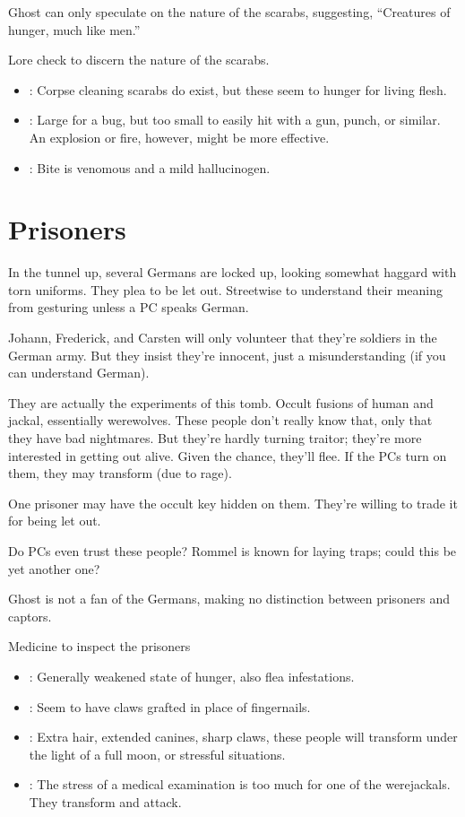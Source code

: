 \documentclass{book}
\newcommand{\df}{\DifficultyDie }
\newcommand{\stb}{\SetbackDie }
\begin{document}
\begin{multicols}{2}
Ghost can only speculate on the nature of the scarabs, suggesting, ``Creatures of hunger, much like men.''

\df\df Lore check to discern the nature of the scarabs.
    \begin{itemize}
        \item \Success: Corpse cleaning scarabs do exist, but these seem to hunger for living flesh.
        \item \Advantage: Large for a bug, but too small to easily hit with a gun, punch, or similar.  An explosion or fire, however, might be more effective.
        \item \Advantage: Bite is venomous and a mild hallucinogen.
    \end{itemize}

\section{Prisoners}

In the tunnel up, several Germans are locked up, looking somewhat haggard with torn uniforms.  They plea to be let out.  \df\df Streetwise to understand their meaning from gesturing unless a PC speaks German.

Johann, Frederick, and Carsten will only volunteer that they're soldiers in the German army.  But they insist they're innocent, just a misunderstanding (if you can understand German).

They are actually the experiments of this tomb.  Occult fusions of human and jackal, essentially werewolves.  These people don't really know that, only that they have bad nightmares.  But they're hardly turning traitor; they're more interested in getting out alive.  Given the chance, they'll flee.  If the PCs turn on them, they may transform (due to rage).

One prisoner may have the occult key hidden on them.  They're willing to trade it for being let out. 

Do PCs even trust these people?  Rommel is known for laying traps; could this be yet another one?

Ghost is not a fan of the Germans, making no distinction between prisoners and captors.

\df\df\stb\stb Medicine to inspect the prisoners
    \begin{itemize}
        \item \Success: Generally weakened state of hunger, also flea infestations.
        \item \Advantage\Advantage: Seem to have claws grafted in place of fingernails.
        \item \Triumph: Extra hair, extended canines, sharp claws, these people will transform under the light of a full moon, or stressful situations.
        \item \Despair: The stress of a medical examination is too much for one of the werejackals.  They transform and attack.
    \end{itemize}



\end{multicols}
\end{document}
